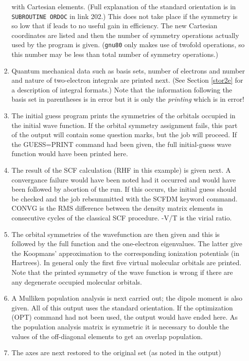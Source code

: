 \begin{enumerate}
with Cartesian elements.  (Full explanation of the standard orientation
is in {\tt SUBROUTINE ORDOC} in link 202.)  This does not take place if the
symmetry is so low that if leads to no useful gain in efficiency.  The
new Cartesian coordinates are listed and then the number of symmetry
operations actually used by the program is given. 
({\tt gnu80} only makes use of twofold operations, so this number
may be less than total number of symmetry operations.)
\item  Quantum mechanical data such as basis sets, number of electrons and
number and nature of two-electron integrals are printed next.  (See
Section \ref{stor2e} for a description of integral formats.)  Note that the
information following the basis set in parentheses is in error but it is
only the {\em printing} which is in error!
\item  The initial guess program prints the 
symmetries of the orbitals occupied
in the initial wave function.  If the orbital symmetry assignment fails,
this part of the output will contain some question marks, but the job
will proceed.  If the GUESS=PRINT command had been given, the full
initial-guess wave function would have been printed here.
\item The result of the SCF calculation (RHF in this example) is given
next.
A convergance failure would have been noted 
had it occurred and would have been followed
by abortion of the run.  If this occurs, the initial guess should be
checked and the job rebsummitted with the SCFDM keyword command.  CONVG
is the RMS difference between the density matrix elements in consecutive
cycles of the classical SCF procedure.  -V/T is the virial ratio.
\item The orbital symmetries of the wavefunction are then given and this is
followed by the full function and the one-electron eigenvalues.  The
latter give the Koopmans' approximation to the corresponding ionization
potentials (in Hartrees).  In general only the first five virtual
molecular orbitals are printed.  Note that the printed symmetry of the
wave function is wrong if there are any degenerate occupied molecular
orbitals.
\item A Mulliken population analysis is next carried out; the dipole moment
is also given.  All of this output uses the standard orientation.  If
the optimization (OPT) command had not been used, the output would have
ended here.  As the population analysis matrix is symmetric it is
necessary to double the values of the off-diagonal elements to get
an overlap population.
\item The axes are next restored to the original set (as noted in the output)

\end{enumerate}
